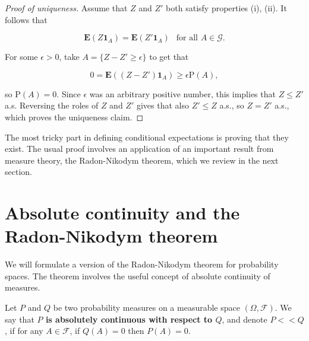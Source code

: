 \begin{proof}[Proof of uniqueness]
Assume that $Z$ and $Z'$ both satisfy properties (i),
(ii). It follows that

\[
\mathbf{E}(Z \mathbf{1}_A) = \mathbf{E}(Z' \mathbf{1}_A)\ \  \textrm{ for all }A \in \mathcal{G}.
\]

\noindent For some $\epsilon>0$, take
$A = \{ Z-Z' \ge \epsilon \}$ to get that

\[
0 = \mathbf{E}( (Z-Z')\mathbf{1}_A ) \ge \epsilon \mathrm{P}(A),
\]

\noindent so $\mathrm{P}(A) = 0$. Since $\epsilon$ was an
arbitrary positive number, this implies that $Z\le Z'$
a.s. Reversing the roles of $Z$ and $Z'$ gives that
also $Z'\le Z$ a.s., so $Z=Z'$ a.s., which proves the
uniqueness claim.
\end{proof}

\noindent The most tricky part in defining conditional
expectations is proving that they exist. The usual
proof involves an application of an important result
from measure theory, the Radon-Nikodym theorem, which
we review in the next section.

\section{Absolute continuity and the Radon-Nikodym theorem}
We will formulate a version of the Radon-Nikodym
theorem for probability spaces. The theorem involves
the useful concept of absolute continuity of measures.

\begin{defn}
Let $P$ and $Q$ be two probability measures on a
measurable space $(\Omega, \mathcal{F})$. We say that
\textbf{$P$ is absolutely continuous with respect to $Q$},
and denote $P<<Q$, if for any $A\in\mathcal{F}$, if
$Q(A)=0$ then $P(A)=0$.
\end{defn}

